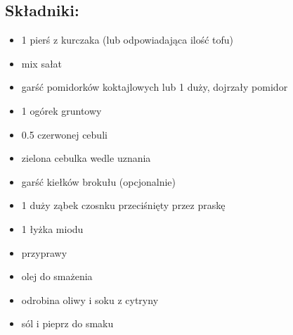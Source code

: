 \documentclass[a4paper,10pt]{book}
\begin{document}
\begin{multicols}{2}

\section*{Składniki:}
\begin{itemize}
    \item 1 pierś z kurczaka (lub odpowiadająca ilość tofu)
    \item mix sałat  
    \item garść pomidorków koktajlowych lub 1 duży, dojrzały pomidor
    \item 1 ogórek gruntowy 
    \item 0.5 czerwonej cebuli
    \item zielona cebulka wedle uznania 
    \item garść kiełków brokułu (opcjonalnie) 
    \item 1 duży ząbek czosnku przeciśnięty przez praskę 
    \item 1 łyżka miodu
    \item przyprawy
    \item olej do smażenia
    \item odrobina oliwy i soku z cytryny
    \item sól i pieprz do smaku
\end{itemize}

\columnbreak

\begin{figure}[H]
    \centering
\end{figure}
\end{multicols}

\vspace{0.5cm} 
\end{document}
